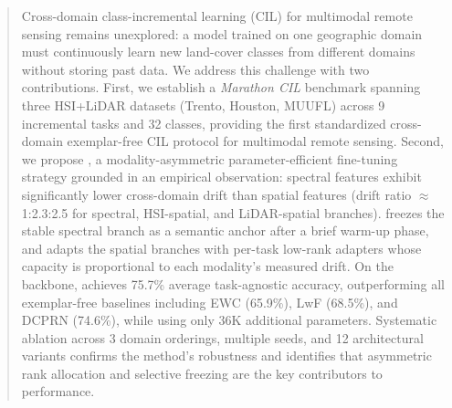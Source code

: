 \begin{abstract}
Cross-domain class-incremental learning (CIL) for multimodal remote sensing remains unexplored: a model trained on one geographic domain must continuously learn new land-cover classes from different domains without storing past data. We address this challenge with two contributions. First, we establish a \emph{Marathon CIL} benchmark spanning three HSI+LiDAR datasets (Trento, Houston, MUUFL) across 9 incremental tasks and 32 classes, providing the first standardized cross-domain exemplar-free CIL protocol for multimodal remote sensing. Second, we propose \methodname{}, a modality-asymmetric parameter-efficient fine-tuning strategy grounded in an empirical observation: spectral features exhibit significantly lower cross-domain drift than spatial features (drift ratio $\approx$1:2.3:2.5 for spectral, HSI-spatial, and LiDAR-spatial branches). \methodname{} freezes the stable spectral branch as a semantic anchor after a brief warm-up phase, and adapts the spatial branches with per-task low-rank adapters whose capacity is proportional to each modality's measured drift. On the \backbonename{} backbone, \methodname{} achieves 75.7\% average task-agnostic accuracy, outperforming all exemplar-free baselines including EWC (65.9\%), LwF (68.5\%), and DCPRN (74.6\%), while using only 36K additional parameters. Systematic ablation across 3 domain orderings, multiple seeds, and 12 architectural variants confirms the method's robustness and identifies that asymmetric rank allocation and selective freezing are the key contributors to performance.
\end{abstract}
